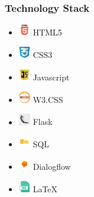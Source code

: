 \documentclass[14pt]{beamer}
\begin{document}
   

\begin{frame}
    \frametitle{Technology Stack}
    \noindent
    \begin{itemize}
        \item [] \includegraphics[width=0.2in, height=0.2in]{./logos/html.png} HTML5 \\
            \pause
        \item [] \includegraphics[width=0.2in, height=0.2in]{./logos/css.png} CSS3 \\
            \pause
        \item [] \includegraphics[width=0.2in, height=0.2in]{./logos/java.png} Javascript \\
            \pause
        \item [] \includegraphics[width=0.2in, height=0.2in]{./logos/w3.png} W3.CSS \\
            \pause
        \item [] \includegraphics[width=0.2in, height=0.2in]{./logos/flask.jpg} Flask \\
            \pause
        \item [] \includegraphics[width=0.2in, height=0.2in]{./logos/sql.jpg} SQL \\
            \pause
        \item [] \includegraphics[width=0.2in, height=0.2in]{./logos/dialogflow.jpg} Dialogflow \\
            \pause
        \item [] \includegraphics[width=0.2in, height=0.2in]{./logos/latex.png} LaTeX \\
    \end{itemize}
\noindent
\end{frame}
\end{document}
